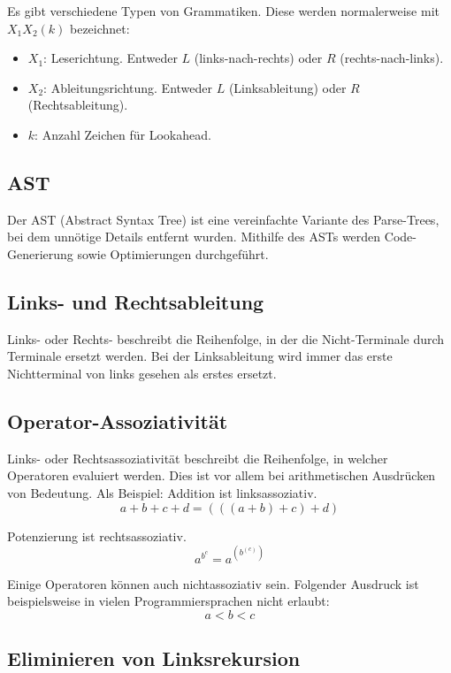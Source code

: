 Es gibt verschiedene Typen von Grammatiken. Diese werden normalerweise mit
$X_1X_2(k)$ bezeichnet:
\begin{itemize}
	\item $X_1$: Leserichtung. Entweder $L$ (links-nach-rechts) oder $R$ (rechts-nach-links).
	\item $X_2$: Ableitungsrichtung. Entweder $L$ (Linksableitung) oder $R$
		(Rechtsableitung).
	\item $k$: Anzahl Zeichen für Lookahead.
\end{itemize}


\subsection{AST}

Der AST (Abstract Syntax Tree) ist eine vereinfachte Variante des Parse-Trees,
bei dem unnötige Details entfernt wurden. Mithilfe des ASTs werden
Code-Generierung sowie Optimierungen durchgeführt.


\subsection{Links- und Rechtsableitung}

Links- oder Rechts- beschreibt die Reihenfolge, in der die Nicht-Terminale durch
Terminale ersetzt werden. Bei der Linksableitung wird immer das erste
Nichtterminal von links gesehen als erstes ersetzt.


\subsection{Operator-Assoziativität}

Links- oder Rechtsassoziativität beschreibt die Reihenfolge, in welcher
Operatoren evaluiert werden.  Dies ist vor allem bei arithmetischen Ausdrücken
von Bedeutung. Als Beispiel: Addition ist linksassoziativ.
\[
	a + b + c + d = (((a + b) + c) + d)
\]

Potenzierung ist rechtsassoziativ.
\[
	a^{b^c} = a^{(b^{(c)})}
\]

Einige Operatoren können auch nichtassoziativ sein. Folgender Ausdruck ist
beispielsweise in vielen Programmiersprachen nicht erlaubt:
\[
	a < b < c
\]


\subsection{Eliminieren von Linksrekursion}

